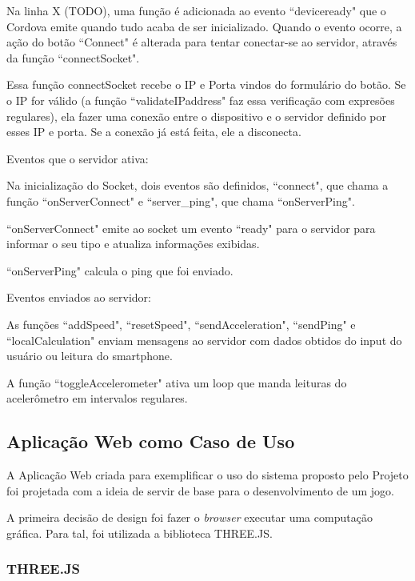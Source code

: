 \documentclass[a4paper,12pt]{article}
\begin{document}
Na linha X (TODO), uma função é adicionada ao evento “deviceready" que o Cordova emite quando tudo acaba de ser inicializado. Quando o evento ocorre, a ação do botão “Connect" é alterada para tentar conectar-se ao servidor, através da função “connectSocket".

Essa função connectSocket recebe o IP e Porta vindos do formulário do botão. Se o IP for válido (a função “validateIPaddress" faz essa verificação com expresões regulares), ela fazer uma conexão entre o dispositivo e o servidor definido por esses IP e porta. Se a conexão já está feita, ele a disconecta.


Eventos que o servidor ativa:

Na inicialização do Socket, dois eventos são definidos, “connect", que chama a função “onServerConnect" e “server\_ping", que chama “onServerPing".

“onServerConnect" emite ao socket um evento “ready" para o servidor para informar o seu tipo e atualiza informações exibidas.

“onServerPing" calcula o ping que foi enviado.


Eventos enviados ao servidor:

As funções “addSpeed", “resetSpeed", “sendAcceleration", “sendPing" e “localCalculation" enviam mensagens ao servidor com dados obtidos do input do usuário ou leitura do smartphone.

A função “toggleAccelerometer" ativa um loop que manda leituras do acelerômetro em intervalos regulares.




\subsection{Aplicação Web como Caso de Uso}

A Aplicação Web criada para exemplificar o uso do sistema proposto pelo Projeto foi projetada com a ideia de servir de base para o desenvolvimento de um jogo.

A primeira decisão de design foi fazer o \emph{browser} executar uma computação gráfica. Para tal, foi utilizada a biblioteca THREE.JS.


\subsubsection{THREE.JS}

\end{document}
